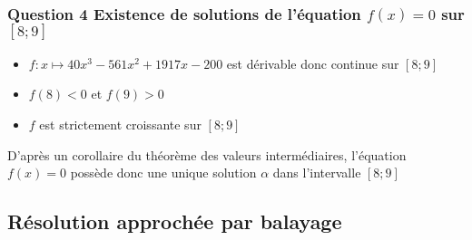 \documentclass[11pt]{article}
\providecommand{\tightlist}{%
      \setlength{\itemsep}{0pt}\setlength{\parskip}{0pt}}
\begin{document}
    \begin{center}
    \end{center}
    { \hspace*{\fill} \\}
    
    \subsubsection{\texorpdfstring{Question 4 Existence de solutions de
l'équation \(f(x)=0\) sur
\([8;9]\)}{Question 4 Existence de solutions de l'équation f(x)=0 sur {[}8;9{]}}}\label{question-4-existence-de-solutions-de-luxe9quation-fx0-sur-89}

    \begin{itemize}
\tightlist
\item
  \(f:x \mapsto 40x^3-561x^2+1917x-200\) est dérivable donc continue sur
  \([8;9]\)
\item
  \(f(8)<0\) et \(f(9)>0\)
\item
  \(f\) est strictement croissante sur \([8;9]\)
\end{itemize}

D'après un corollaire du théorème des valeurs intermédiaires, l'équation
\(f(x)=0\) possède donc une unique solution \(\alpha\) dans l'intervalle
\([8;9]\)

    \subsection{Résolution approchée par
balayage}\label{ruxe9solution-approchuxe9e-par-balayage}
\end{document}
